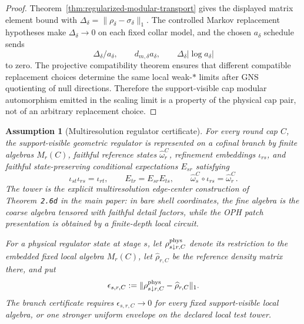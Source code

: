\documentclass[11pt]{article}
\newtheorem{assumption}[theorem]{Assumption}
\begin{document}
\begin{proof}
Theorem~\ref{thm:regularized-modular-transport} gives the displayed matrix
element bound with
\(\Delta_\delta=\|\rho_\delta-\sigma_\delta\|_1\). The controlled Markov
replacement hypotheses make \(\Delta_\delta\to0\) on each fixed collar model,
and the chosen \(a_\delta\) schedule sends
\[
\Delta_\delta/a_\delta,\qquad
d_{m,\delta}a_\delta,\qquad
\Delta_\delta|\log a_\delta|
\]
to zero. The projective compatibility theorem ensures that different
compatible replacement choices determine the same local weak-\(*\) limits after
GNS quotienting of null directions. Therefore the support-visible cap modular
automorphism emitted in the scaling limit is a property of the physical cap
pair, not of an arbitrary replacement choice.
\end{proof}

\begin{assumption}[Multiresolution regulator certificate]\label{ass:multiresolution-regulator-certificate}
For every round cap \(C\), the support-visible geometric regulator is represented on a cofinal
branch by finite algebras \(M_r(C)\), faithful reference states \(\widehat\omega_r^C\),
refinement embeddings \(\iota_{rs}\), and faithful state-preserving conditional expectations
\(E_{sr}\) satisfying
\[
\iota_{st}\iota_{rs}=\iota_{rt},\qquad
E_{tr}=E_{sr}E_{ts},\qquad
\widehat\omega_s^C\circ\iota_{rs}=\widehat\omega_r^C.
\]
The tower is the explicit multiresolution edge-center construction of
Theorem~\texttt{2.6d} in the main paper: in bare shell coordinates, the fine algebra is the coarse
algebra tensored with faithful detail factors, while the OPH patch presentation is obtained by a
finite-depth local circuit.

For a physical regulator state at stage \(s\), let
\(\rho^{\rm phys}_{s\downarrow r,C}\) denote its restriction to the embedded fixed local algebra
\(M_r(C)\), let \(\widehat\rho_{r,C}\) be the reference density matrix there, and put
\[
\epsilon_{s,r,C}:=
\|\rho^{\rm phys}_{s\downarrow r,C}-\widehat\rho_{r,C}\|_1.
\]
The branch certificate requires \(\epsilon_{s,r,C}\to0\) for every fixed support-visible local
algebra, or one stronger uniform envelope on the declared local test tower.
\end{assumption}
\end{document}
